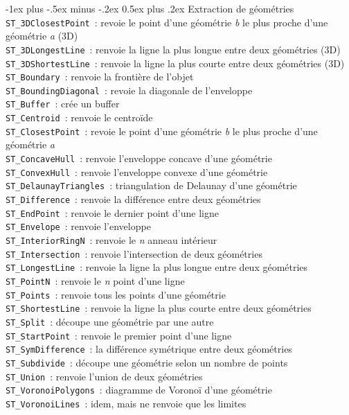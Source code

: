 \documentclass[10pt,landscape, a4paper]{article}
\makeatletter
\renewcommand{\section}{\@startsection{section}{1}{0mm}%
                                {-1ex plus -.5ex minus -.2ex}%
                                {0.5ex plus .2ex}%
                                {\normalfont\large\bfseries}}
\makeatother
\begin{document}
\begin{multicols}{3}
\section{Extraction de géométries}
\texttt{ST\_3DClosestPoint}~: revoie le point d'une géométrie \emph{b} le plus proche d'une géométrie \emph{a} (3D)\\
\texttt{ST\_3DLongestLine}~: renvoie la ligne la plus longue entre deux géométries (3D)\\
\texttt{ST\_3DShortestLine}~: renvoie la ligne la plus courte entre deux géométries (3D)\\
\texttt{ST\_Boundary}~: renvoie la frontière de l'objet\\
\texttt{ST\_BoundingDiagonal}~: revoie la diagonale de l'enveloppe\\
\texttt{ST\_Buffer}~: crée un buffer\\
\texttt{ST\_Centroid}~: renvoie le centroïde\\
\texttt{ST\_ClosestPoint}~:  revoie le point d'une géométrie \emph{b} le plus proche d'une géométrie \emph{a}\\
\texttt{ST\_ConcaveHull}~: renvoie l'enveloppe concave d'une géométrie\\
\texttt{ST\_ConvexHull}~:  renvoie l'enveloppe convexe d'une géométrie\\
\texttt{ST\_DelaunayTriangles}~: triangulation de Delaunay d'une géométrie\\
\texttt{ST\_Difference}~: renvoie la différence entre deux géométries\\
\texttt{ST\_EndPoint}~: renvoie le dernier point d'une ligne\\
\texttt{ST\_Envelope}~: renvoie l'enveloppe \\
\texttt{ST\_InteriorRingN}~: renvoie le \emph{n} anneau intérieur \\
\texttt{ST\_Intersection}~: renvoie l'intersection de deux géométries\\
\texttt{ST\_LongestLine}~: renvoie la ligne la plus longue entre deux géométries\\
\texttt{ST\_PointN}~:  renvoie le \emph{n} point d'une ligne\\
\texttt{ST\_Points}~: renvoie tous les points d'une géométrie\\
\texttt{ST\_ShortestLine}~: renvoie la ligne la plus courte entre deux géométries\\
\texttt{ST\_Split}~: découpe une géométrie par une autre\\
\texttt{ST\_StartPoint}~: renvoie le premier point d'une ligne\\
\texttt{ST\_SymDifference}~: la différence symétrique entre deux géométries\\
\texttt{ST\_Subdivide}~: découpe une géométrie selon un nombre de points\\
\texttt{ST\_Union}~: renvoie l'union de deux géométries\\
\texttt{ST\_VoronoiPolygons}~: diagramme de Voronoï d'une géométrie\\
\texttt{ST\_VoronoiLines}~: idem, mais ne renvoie que les limites\\


\end{multicols}
\end{document}
